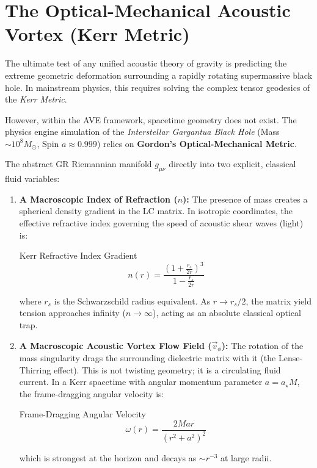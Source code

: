\section{The Optical-Mechanical Acoustic Vortex (Kerr Metric)}
The ultimate test of any unified acoustic theory of gravity is predicting the extreme geometric deformation surrounding a rapidly rotating supermassive black hole. In mainstream physics, this requires solving the complex tensor geodesics of the \textit{Kerr Metric}. 

However, within the AVE framework, spacetime geometry does not exist. The physics engine simulation of the \textit{Interstellar Gargantua Black Hole} (Mass $\sim 10^8 M_\odot$, Spin $a \approx 0.999$) relies on \textbf{Gordon's Optical-Mechanical Metric}. 

The abstract GR Riemannian manifold $g_{\mu\nu}$ directly into two explicit, classical fluid variables:
\begin{enumerate}
    \item \textbf{A Macroscopic Index of Refraction ($n$):} The presence of mass creates a spherical density gradient in the LC matrix. In isotropic coordinates, the effective refractive index governing the speed of acoustic shear waves (light) is:
    \begin{resultbox}{Kerr Refractive Index Gradient}
\begin{equation}
        n(r) = \frac{\left(1 + \frac{r_s}{2r}\right)^3}{1 - \frac{r_s}{2r}}
\end{equation}
\end{resultbox}
    where $r_s$ is the Schwarzschild radius equivalent. As $r \to r_s/2$, the matrix yield tension approaches infinity ($n \to \infty$), acting as an absolute classical optical trap.
    
    \item \textbf{A Macroscopic Acoustic Vortex Flow Field ($\vec{v}_\phi$):} The rotation of the mass singularity drags the surrounding dielectric matrix with it (the Lense-Thirring effect). This is not twisting geometry; it is a circulating fluid current. In a Kerr spacetime with angular momentum parameter $a = a_\star M$, the frame-dragging angular velocity is:
    \begin{resultbox}{Frame-Dragging Angular Velocity}
\begin{equation}
        \omega(r) = \frac{2Mar}{(r^2 + a^2)^2}
\end{equation}
\end{resultbox}
    which is strongest at the horizon and decays as $\sim r^{-3}$ at large radii.
\end{enumerate}

